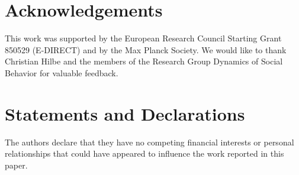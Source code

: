 \documentclass[11pt]{article}
\theoremstyle{plainCl1}
\theoremstyle{plainCl2}
\begin{document}






\section*{Acknowledgements}
This work was supported by the European Research Council Starting Grant 850529 (E-DIRECT) and by the Max Planck Society. We would like to thank Christian Hilbe and the members of the Research Group Dynamics of Social Behavior for valuable feedback.
\section*{Statements and Declarations}
The authors declare that they have no competing financial interests or personal relationships that could have appeared to influence the work reported in this paper.
\newpage
\end{document}
